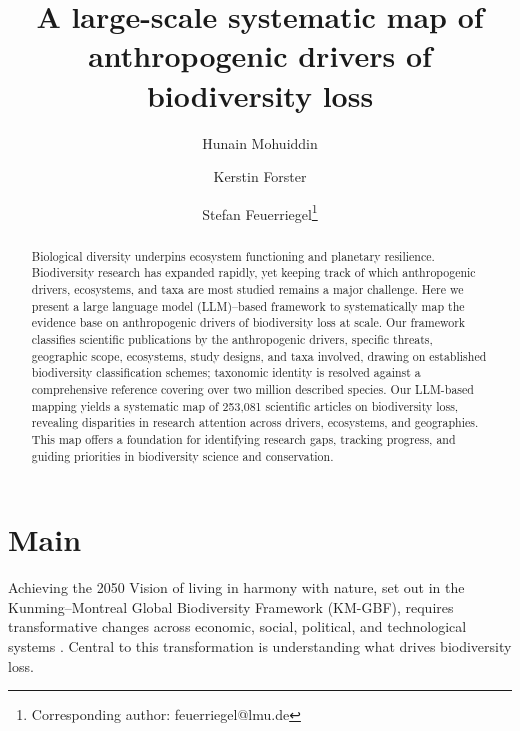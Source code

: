 \documentclass[12pt]{article}
\begin{document}

\title{\centering\LARGE\singlespacing A large-scale systematic map of anthropogenic drivers of biodiversity loss}

\renewcommand\Affilfont{\fontsize{9}{10.8}\selectfont}

\author[1]{Hunain Mohuiddin}
\author[1,2]{Kerstin Forster}
\author[,1,2]{Stefan Feuerriegel\thanks{Corresponding author: feuerriegel@lmu.de}}


\date{}
\maketitle
\newpage
\linenumbers

\begin{abstract}\normalfont
\noindent
Biological diversity underpins ecosystem functioning and planetary resilience. Biodiversity research has expanded rapidly, yet keeping track of which anthropogenic drivers, ecosystems, and taxa are most studied remains a major challenge. Here we present a large language model (LLM)--based framework to systematically map the evidence base on anthropogenic drivers of biodiversity loss at scale. Our framework classifies scientific publications by the anthropogenic drivers, specific threats, geographic scope, ecosystems, study designs, and taxa involved, drawing on established biodiversity classification schemes; taxonomic identity is resolved against a comprehensive reference covering over two million described species. Our LLM-based mapping yields a systematic map of 253{,}081 scientific articles on biodiversity loss, revealing disparities in research attention across drivers, ecosystems, and geographies. This map offers a foundation for identifying research gaps, tracking progress, and guiding priorities in biodiversity science and conservation.

\end{abstract}
\flushbottom
\maketitle
\thispagestyle{empty}
\sloppy
\raggedbottom
\newpage

\section*{Main}
\label{sec:main}
Achieving the 2050 Vision of living in harmony with nature, set out in the Kunming--Montreal Global Biodiversity Framework (KM-GBF), requires 
transformative changes across economic, social, political, and technological systems \cite{spm_ga_ipbes_2019}. Central to this transformation is understanding what drives biodiversity loss.
\end{document}
